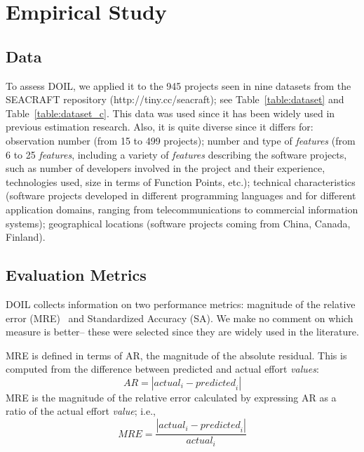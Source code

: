 \documentclass[10pt,conference]{IEEEtran}
\begin{document}


 
 
\section{Empirical Study} \label{sect:study} 

\subsection{Data}

To assess DOIL, we applied it to the 945 projects
seen in nine    datasets from the SEACRAFT repository (http://tiny.cc/seacraft); see Table~\ref{table:dataset} and Table~\ref{table:dataset_c}. 
This data was used since it has been  widely  used in previous estimation research.
Also, it  is quite diverse since it differs for: observation number (from 15 to 499 projects); number and type of {\em features} (from 6 to 25 {\em features}, including a variety of {\em features} describing the software projects, such as number of developers involved in the project and their experience, technologies used, size in terms of Function Points, etc.); technical characteristics (software projects developed in different programming languages and for different application domains, ranging from telecommunications to commercial information systems); geographical locations (software projects coming from China, Canada, Finland). 


\subsection{Evaluation Metrics}


 
DOIL collects information on two performance metrics: magnitude of the relative error (MRE)~\cite{Conte:1986:SEM:6176} and Standardized Accuracy (SA).  We make no comment
on which   measure is better-- these were selected since they are widely used in the literature.


MRE is defined in terms of 
AR,  the magnitude of the absolute residual. This is  computed from the difference between predicted and actual effort {\em values}:
\[
\mathit{AR} = |\mathit{actual}_i - \mathit{predicted}_i|
\] 
MRE is the magnitude of the relative error calculated by expressing AR as a ratio of the actual effort {\em value}; i.e., 
\[
\mathit{MRE} = \frac{|\mathit{actual}_i - \mathit{predicted}_i|}{\mathit{actual}_i}
\]
\end{document}
